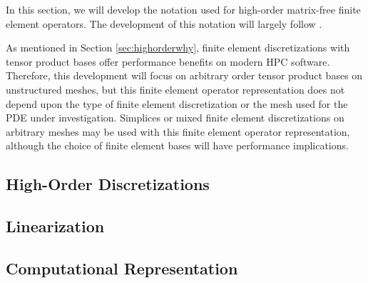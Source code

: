 In this section, we will develop the notation used for high-order matrix-free finite element operators.
The development of this notation will largely follow \cite{brown2010efficient}.

As mentioned in Section \ref{sec:highorderwhy}, finite element discretizations with tensor product bases offer performance benefits on modern HPC software.
Therefore, this development will focus on arbitrary order tensor product bases on unstructured meshes, but this finite element operator representation does not depend upon the type of finite element discretization or the mesh used for the PDE under investigation.
Simplices or mixed finite element discretizations on arbitrary meshes may be used with this finite element operator representation, although the choice of finite element bases will have performance implications.

\subsection{High-Order Discretizations}


\subsection{Linearization}


\subsection{Computational Representation}

